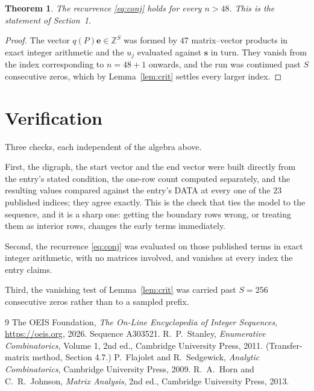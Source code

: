 \documentclass[11pt,a4paper]{article}
\theoremstyle{plain}
\newtheorem{theorem}{Theorem}
\theoremstyle{definition}
\begin{document}
\begin{theorem}
The recurrence \eqref{eq:conj} holds for every $n>48$. This is the statement of
Section~1.
\end{theorem}

\begin{proof}
The vector $q(P)\mathbf{e}\in\mathbb{Z}^{S}$ was formed by $47$ matrix--vector
products in exact integer arithmetic and the $u_j$ evaluated against $\mathbf{s}$ in turn.
They vanish from the index corresponding to $n=48+1$ onwards, and the run was continued
past $S$ consecutive zeros, which by Lemma~\ref{lem:crit} settles every larger index.
\end{proof}

\section{Verification}

Three checks, each independent of the algebra above.

First, the digraph, the start vector and the end vector were built directly from the
entry's stated condition, the one-row count computed separately, and the resulting values
compared against the entry's DATA at every one of the $23$ published indices; they
agree exactly. This is the check that ties the model to the sequence, and it is a sharp one:
getting the boundary rows wrong, or treating them as interior rows, changes the early terms
immediately.

Second, the recurrence \eqref{eq:conj} was evaluated on those published terms in exact
integer arithmetic, with no matrices involved, and vanishes at every index the entry claims.

Third, the vanishing test of Lemma~\ref{lem:crit} was carried past $S=256$ consecutive
zeros rather than to a sampled prefix.

\begin{thebibliography}{9}
 The OEIS Foundation, \emph{The On-Line Encyclopedia of Integer
Sequences}, \url{https://oeis.org}, 2026. Sequence A303521.
 R.~P.~Stanley, \emph{Enumerative Combinatorics}, Volume 1, 2nd ed.,
Cambridge University Press, 2011. (Transfer-matrix method, Section 4.7.)
 P.~Flajolet and R.~Sedgewick, \emph{Analytic Combinatorics}, Cambridge
University Press, 2009.
 R.~A.~Horn and C.~R.~Johnson, \emph{Matrix Analysis}, 2nd ed., Cambridge
University Press, 2013.
\end{thebibliography}
\end{document}

